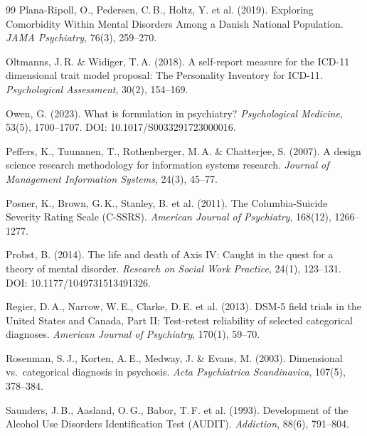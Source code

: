 \documentclass[11pt,a4paper]{article}
\begin{document}
\begin{thebibliography}{99}
Plana-Ripoll, O., Pedersen, C.\,B., Holtz, Y. et al. (2019).
\newblock Exploring Comorbidity Within Mental Disorders Among a Danish National Population.
\newblock \textit{JAMA Psychiatry}, 76(3), 259--270.

Oltmanns, J.\,R. \& Widiger, T.\,A. (2018).
\newblock A self-report measure for the ICD-11 dimensional trait model proposal: The Personality Inventory for ICD-11.
\newblock \textit{Psychological Assessment}, 30(2), 154--169.

Owen, G. (2023).
\newblock What is formulation in psychiatry?
\newblock \textit{Psychological Medicine}, 53(5), 1700--1707. DOI: 10.1017/S0033291723000016.

Peffers, K., Tuunanen, T., Rothenberger, M.\,A. \& Chatterjee, S. (2007).
\newblock A design science research methodology for information systems research.
\newblock \textit{Journal of Management Information Systems}, 24(3), 45--77.

Posner, K., Brown, G.\,K., Stanley, B. et al. (2011).
\newblock The Columbia-Suicide Severity Rating Scale (C-SSRS).
\newblock \textit{American Journal of Psychiatry}, 168(12), 1266--1277.

Probst, B. (2014).
\newblock The life and death of Axis IV: Caught in the quest for a theory of mental disorder.
\newblock \textit{Research on Social Work Practice}, 24(1), 123--131. DOI: 10.1177/1049731513491326.

Regier, D.\,A., Narrow, W.\,E., Clarke, D.\,E. et al. (2013).
\newblock DSM-5 field trials in the United States and Canada, Part II: Test-retest reliability of selected categorical diagnoses.
\newblock \textit{American Journal of Psychiatry}, 170(1), 59--70.

Rosenman, S.\,J., Korten, A.\,E., Medway, J. \& Evans, M. (2003).
\newblock Dimensional vs.\ categorical diagnosis in psychosis.
\newblock \textit{Acta Psychiatrica Scandinavica}, 107(5), 378--384.

Saunders, J.\,B., Aasland, O.\,G., Babor, T.\,F. et al. (1993).
\newblock Development of the Alcohol Use Disorders Identification Test (AUDIT).
\newblock \textit{Addiction}, 88(6), 791--804.


\end{thebibliography}
\end{document}
